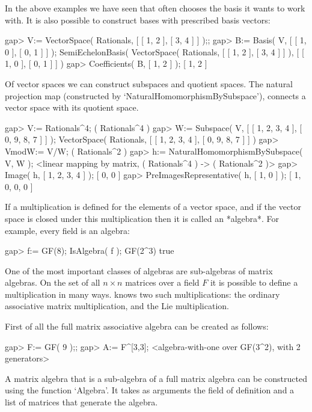 In the above examples we have seen that {\GAP} often chooses the basis
it wants to work with. It is also possible to construct bases with
prescribed basis vectors:

\beginexample
    gap> V:= VectorSpace( Rationals, [ [ 1, 2 ], [ 3, 4 ] ] );; 
    gap> B:= Basis( V, [ [ 1, 0 ], [ 0, 1 ] ] );
    SemiEchelonBasis( VectorSpace( Rationals, [ [ 1, 2 ], [ 3, 4 ] ] ), 
    [ [ 1, 0 ], [ 0, 1 ] ] )
    gap> Coefficients( B, [ 1, 2 ] );
    [ 1, 2 ]
\endexample

Of vector spaces we can construct subspaces and quotient spaces. The
natural projection map (constructed by `NaturalHomomorphismBySubspace'),
connects a vector space with its quotient space.

\beginexample
     gap> V:= Rationals^4;
     ( Rationals^4 )
     gap> W:= Subspace( V, [ [ 1, 2, 3, 4 ], [ 0, 9, 8, 7 ] ] );
     VectorSpace( Rationals, [ [ 1, 2, 3, 4 ], [ 0, 9, 8, 7 ] ] )
     gap> VmodW:= V/W;
     ( Rationals^2 )
     gap> h:= NaturalHomomorphismBySubspace( V, W );
     <linear mapping by matrix, ( Rationals^4 ) -> ( Rationals^2 )>
     gap> Image( h, [ 1, 2, 3, 4 ] );
     [ 0, 0 ]
     gap> PreImagesRepresentative( h, [ 1, 0 ] );
     [ 1, 0, 0, 0 ]
\endexample



If a multiplication is defined for the elements of a vector space,
and if the vector space is closed under this multiplication then it is
called an *algebra*. For example, every field is an algebra:

\beginexample
    gap> f:= GF(8); IsAlgebra( f );
    GF(2^3)
    true
\endexample

One of the most important classes of algebras are sub-algebras of matrix
algebras. On the set of all $n\times n$ matrices over a field $F$
it is possible to define a multiplication in many ways. {\GAP} knows 
two such multiplications: the ordinary associative matrix multiplication,
and the Lie multiplication. 

First of all the full matrix associative algebra can be created as
follows:

\beginexample
    gap> F:= GF( 9 );;
    gap> A:= F^[3,3];
    <algebra-with-one over GF(3^2), with 2 generators>
\endexample

A matrix algebra that is a sub-algebra of a full matrix algebra can be
constructed using the function `Algebra'. It takes as arguments the field 
of definition and a list of matrices that generate the algebra.

